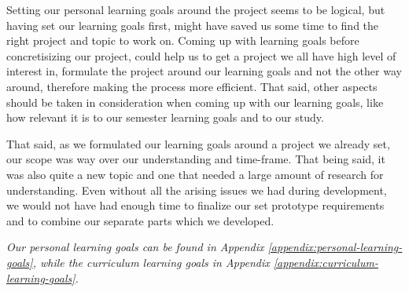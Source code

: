 Setting our personal learning goals around the project seems to be logical, but having set our learning goals first, might have saved us some time to find the right project and topic to work on. Coming up with learning goals before concretisizing our project, could help us to get a project we all have high level of interest in, formulate the project around our learning goals and not the other way around, therefore making the process more efficient. That said, other aspects should be taken in consideration when coming up with our learning goals, like how relevant it is to our semester learning goals and to our study.

That said, as we formulated our learning goals around a project we already set, our scope was way over our understanding and time-frame. That being said, it was also quite a new topic and one that needed a large amount of research for understanding. Even without all the arising issues we had during development, we would not have had enough time to finalize our set prototype requirements and to combine our separate parts which we developed.

\textit{Our personal learning goals can be found in Appendix \ref{appendix:personal-learning-goals}, while the curriculum learning goals in Appendix \ref{appendix:curriculum-learning-goals}.}